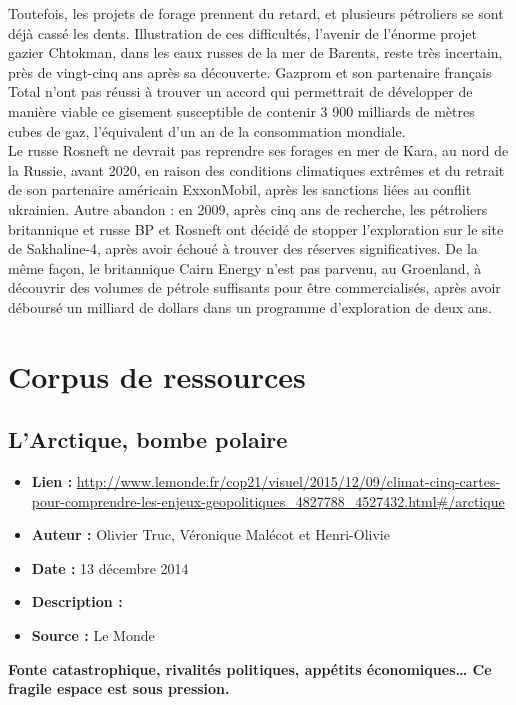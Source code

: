 \documentclass[8pt]{article}
\begin{document}
Toutefois, les projets de forage prennent du retard, et plusieurs pétroliers se sont déjà cassé les dents. Illustration de ces difficultés, l’avenir de l’énorme projet gazier Chtokman, dans les eaux russes de la mer de Barents, reste très incertain, près de vingt-cinq ans après sa découverte. Gazprom et son partenaire français Total n’ont pas réussi à trouver un accord qui permettrait de développer de manière viable ce gisement susceptible de contenir 3 900 milliards de mètres cubes de gaz, l’équivalent d’un an de la consommation mondiale. \\

Le russe Rosneft ne devrait pas reprendre ses forages en mer de Kara, au nord de la Russie, avant 2020, en raison des conditions climatiques extrêmes et du retrait de son partenaire américain ExxonMobil, après les sanctions liées au conflit ukrainien. Autre abandon : en 2009, après cinq ans de recherche, les pétroliers britannique et russe BP et Rosneft ont décidé de stopper l’exploration sur le site de Sakhaline-4, après avoir échoué à trouver des réserves significatives. De la même façon, le britannique Cairn Energy n’est pas parvenu, au Groenland, à découvrir des volumes de pétrole suffisants pour être commercialisés, après avoir déboursé un milliard de dollars dans un programme d’exploration de deux ans.


\section{Corpus de ressources}


\subsection{L’Arctique, bombe polaire }

\begin{itemize}
	\item \textbf{Lien : }  \url{http://www.lemonde.fr/cop21/visuel/2015/12/09/climat-cinq-cartes-pour-comprendre-les-enjeux-geopolitiques_4827788_4527432.html#/arctique} 
	\item \textbf{Auteur : }  Olivier Truc, Véronique Malécot et Henri-Olivie
	\item \textbf{Date : } 13 décembre 2014
	\item \textbf{Description : } 
	\item \textbf{Source : } Le Monde
\end{itemize}

\textbf{Fonte catastrophique, rivalités politiques, appétits économiques… Ce fragile espace est sous pression.}
\end{document}
